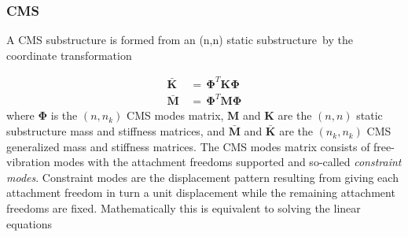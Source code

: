 \documentclass[11pt,openany,twoside]{book}
\numberwithin{equation}{section}		%
\newcommand{\Newterm}[1]{{\em #1}}
\newcommand{\Matrix}[1]{\boldsymbol{#1}}
\newcommand{\Ss}{substructure}
\begin{document}
\subsubsection{CMS}
\par
A CMS substructure is formed from an (n,n) static \Ss\
by the coordinate transformation

\begin{equation}\label{eqn:dsstrans}
\begin{split}
\Matrix{\bar{K}} & \, = \, \Matrix{\Phi}^T \Matrix{K} \Matrix{\Phi} \\
\Matrix{\bar{M}} & \, = \, \Matrix{\Phi}^T \Matrix{M} \Matrix{\Phi}
\end{split}
\end{equation}
where $\Matrix{\Phi}$ is the $(n,n_k )$ CMS modes matrix,
$\Matrix{M}$ and $\Matrix{K}$
are the $(n,n)$ static substructure mass and stiffness matrices, and
$\Matrix{\bar{M}}$ and $\Matrix{\bar{K}}$ are the $(n_k , n_k)$
CMS generalized mass and stiffness matrices.
The CMS modes matrix consists of free-vibration
modes with the attachment freedoms supported and so-called
\Newterm{constraint modes}.
Constraint modes are the displacement pattern resulting
from  giving each attachment freedom in turn a unit displacement while
the remaining attachment freedoms are fixed.
Mathematically this is equivalent to solving the linear equations
\end{document}
